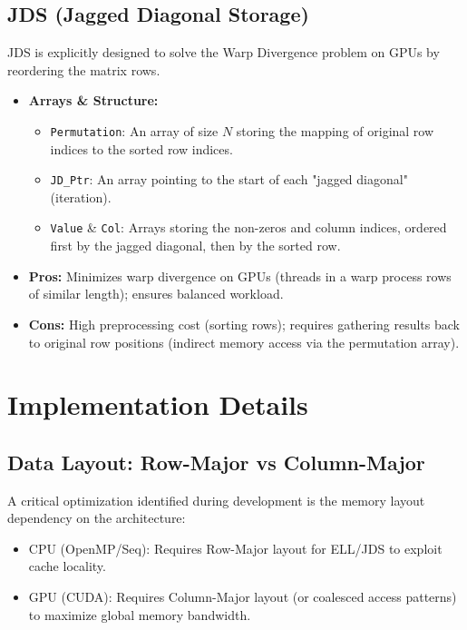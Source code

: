\documentclass[a4paper,12pt]{article}
\begin{document}
\subsection{JDS (Jagged Diagonal Storage)}
JDS is explicitly designed to solve the Warp Divergence problem on GPUs by reordering the matrix rows.

\begin{itemize}
    \item \textbf{Arrays \& Structure:}
    \begin{itemize}
        \item \texttt{Permutation}: An array of size $N$ storing the mapping of original row indices to the sorted row indices.
        \item \texttt{JD\_Ptr}: An array pointing to the start of each "jagged diagonal" (iteration).
        \item \texttt{Value} \& \texttt{Col}: Arrays storing the non-zeros and column indices, ordered first by the jagged diagonal, then by the sorted row.
    \end{itemize}

    \item \textbf{Pros:} Minimizes warp divergence on GPUs (threads in a warp process rows of similar length); ensures balanced workload.
    \item \textbf{Cons:} High preprocessing cost (sorting rows); requires gathering results back to original row positions (indirect memory access via the permutation array).
\end{itemize}

\newpage
\section{Implementation Details}

\subsection{Data Layout: Row-Major vs Column-Major}
A critical optimization identified during development is the memory layout dependency on the architecture:
\begin{itemize}
    \item CPU (OpenMP/Seq): Requires Row-Major layout for ELL/JDS to exploit cache locality.
    \item GPU (CUDA): Requires Column-Major layout (or coalesced access patterns) to maximize global memory bandwidth.
\end{itemize}
\end{document}
